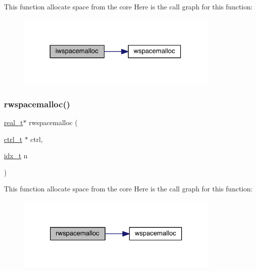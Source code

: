 This function allocate space from the core Here is the call graph for this function\+:\nopagebreak
\begin{figure}[H]
\begin{center}
\leavevmode
\includegraphics[width=278pt]{a00981_a24ba749ade92aef079e88d233317c068_cgraph}
\end{center}
\end{figure}
\mbox{\label{a00981_a194ce386758eefa7996960b928c5d0aa}} 
\subsubsection{\texorpdfstring{rwspacemalloc()}{rwspacemalloc()}}
{\footnotesize\ttfamily \hyperlink{a00876_a1924a4f6907cc3833213aba1f07fcbe9}{real\+\_\+t}$\ast$ rwspacemalloc (\begin{DoxyParamCaption}\item[{\hyperlink{a00742}{ctrl\+\_\+t} $\ast$}]{ctrl,  }\item[{\hyperlink{a00876_aaa5262be3e700770163401acb0150f52}{idx\+\_\+t}}]{n }\end{DoxyParamCaption})}

This function allocate space from the core Here is the call graph for this function\+:\nopagebreak
\begin{figure}[H]
\begin{center}
\leavevmode
\includegraphics[width=280pt]{a00981_a194ce386758eefa7996960b928c5d0aa_cgraph}
\end{center}
\end{figure}
\mbox{\label{a00981_a371b41152c6e40d6866b357a4ffee5f1}} 
